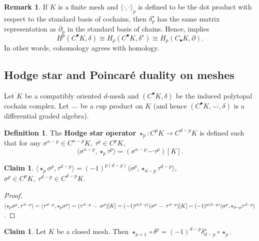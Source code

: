 \documentclass{elsarticle}
\theoremstyle{definition}
\newtheorem{claim}[theorem]{Claim}
\newtheorem{definition}[theorem]{Definition}
\newtheorem{remark}[theorem]{Remark}
\newcommand{\inner}[2]{\langle#1,#2\rangle}
\begin{document}
\begin{remark}
\label{thm:cohomology_equals_homology}
  If $K$ is a finite mesh and $\inner{\cdot}{\cdot}_p$ is defined to be the dot product with respect to the standard basis of cochains, then $\delta^\star_p$ has the same matrix representation as $\partial_p$ in the standard basis of chains. Hence,  implies
  \begin{equation}
    H^p(C^{\bullet} K, \delta)
      \cong H_p(C^{\bullet} K, \delta^\star)
      \cong H_p(C_{\bullet} K, \partial).
  \end{equation}
  In other words, cohomology agrees with homology.
\end{remark}

\subsection{Hodge star and Poincar\'e duality on meshes}
\label{sec:hodge_poincare}
Let $K$ be a compatibly oriented $d$-mesh and $(C^\bullet K, \delta)$ be the induced polytopal cochain complex. Let $\smile$ be a cup product on $K$ (and hence $(C^\bullet K, \smile, \delta)$ is a differential graded algebra).
\begin{definition}
  The \textbf{Hodge star operator} $\star_p \colon C^p K \to C^{d - p} K$ is defined such that for any  $\sigma^{n - p} \in C^{n - p} K ,\ \tau^p \in C^p K,$
  \begin{equation}
    \inner{\sigma^{n - p}}{\star_p \tau^p} = (\sigma^{n - p} \smile \tau^p)[K].
  \end{equation}	 
\end{definition}
\begin{claim}
  $\inner{\star_p \sigma^p}{\tau^{d - p}}
    = (-1)^{p (d - p)} \inner{\sigma^p}{\star_{d - p} \tau^{d - p}}$, 
  $\sigma^p \in C^p K,\ \tau^{d - p} \in C^{d - p} K$.
\end{claim}
\begin{proof}
  $\inner{\star_p \sigma^p}{\tau^{d - p}} 
    = \inner{\tau^{d - p}}{\star_p \sigma^p} 
    = (\tau^{d - p} \smile \sigma^p)[K] \\
    = (-1)^{p (d - p)} (\sigma^p \smile \tau^{d - p})[K] 
    = (-1)^{p (d - p)}\inner{\sigma^p}{\star_{d - p} \tau^{d - p}}$.
\end{proof}
\begin{claim}
  Let $K$ be a closed mesh. Then
  $\star_{p + 1} \circ \delta^p 
    = (-1)^{d - p} \delta^\star_{d - p} \circ \star_p$.
\end{claim}
\end{document}
